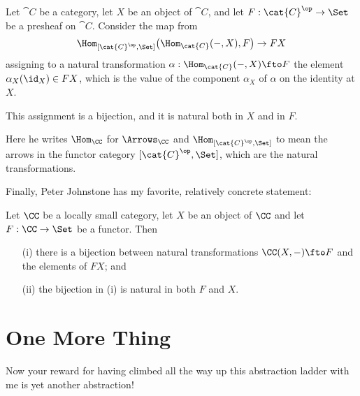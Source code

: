 \begin{lemma}[Yoneda]\label{yoneda-perrone} Let $\cat{C}$ be a category, let $X$ be an
 object of $\cat{C}$, and let $F:\cat{C}^\op\to\Set$ be a presheaf on $\cat{C}$. Consider
 the map from
 $$
 \Hom_{[\cat{C}^\op,\Set]} \bigl(\Hom_\cat{C} (-,X) , F \bigr) \to FX
 $$
 assigning to a natural transformation $\alpha:\Hom_\cat{C} (-,X)\fto F$ the element
 $\alpha_X(\id_X)\in FX$, which is the value of the component $\alpha_X$ of $\alpha$ on
 the identity at $X$. 

This assignment is a bijection, and it is natural both in $X$ and in $F$.
\end{lemma}
\noindent
Here he writes $\Hom_\CC$ for $\Arrows_\CC$ and $\Hom_{[\cat{C}^\op,\Set]}$ to mean the
arrows in the functor category $[\cat{C}^\op,\Set]$, which are the natural
transformations.

\pg
Finally, Peter Johnstone \cite{Johnstone} has my favorite, relatively concrete statement:

\begin{lemma}[Yoneda]\label{yoneda-johnstone} Let $\CC$ be a locally small category, let
$X$ be an object of $\CC$ and let $F:\CC \to \Set$ be a functor. Then
\begin{enumerate}
\item[(i)]  there is a bijection between natural transformations $\CC(X, -) \fto F$ and the 
elements of $FX$; and

\item[(ii)] the bijection in (i) is natural in both $F$ and $X$.
\end{enumerate}

\end{lemma}

\section{One More Thing}

Now your reward for having climbed all the way up this abstraction ladder with me is yet
another abstraction!

